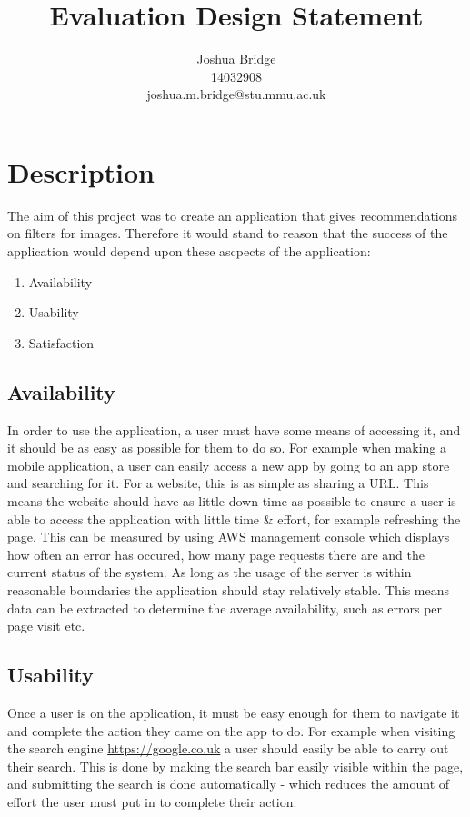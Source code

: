 \documentclass[a4paper,12pt]{article}
\title{\vspace{2cm}\textbf{Evaluation Design Statement}}
\author{Joshua Bridge\\14032908\\joshua.m.bridge@stu.mmu.ac.uk}
\begin{document}
\maketitle

\tableofcontents

\doublespacing

\newpage

\section{Description}
  The aim of this project was to create an application that gives recommendations on filters for images. Therefore it would stand to reason that the success of the application would depend upon these ascpects of the application:

  \begin{enumerate}
    \item Availability
    \item Usability
    \item Satisfaction
  \end{enumerate}

  \subsection{Availability}
    In order to use the application, a user must have some means of accessing it, and it should be as easy as possible for them to do so. For example when making a mobile application, a user can easily access a new app by going to an app store and searching for it. For a website, this is as simple as sharing a URL. This means the website should have as little down-time as possible to ensure a user is able to access the application with little time \& effort, for example refreshing the page. This can be measured by using AWS management console which displays how often an error has occured, how many page requests there are and the current status of the system. As long as the usage of the server is within reasonable boundaries the application should stay relatively stable. This means data can be extracted to determine the average availability, such as errors per page visit etc.

  \subsection{Usability}
    Once a user is on the application, it must be easy enough for them to navigate it and complete the action they came on the app to do. For example when visiting the search engine \url{https://google.co.uk} a user should easily be able to carry out their search. This is done by making the search bar easily visible within the page, and submitting the search is done automatically - which reduces the amount of effort the user must put in to complete their action.
\end{document}
